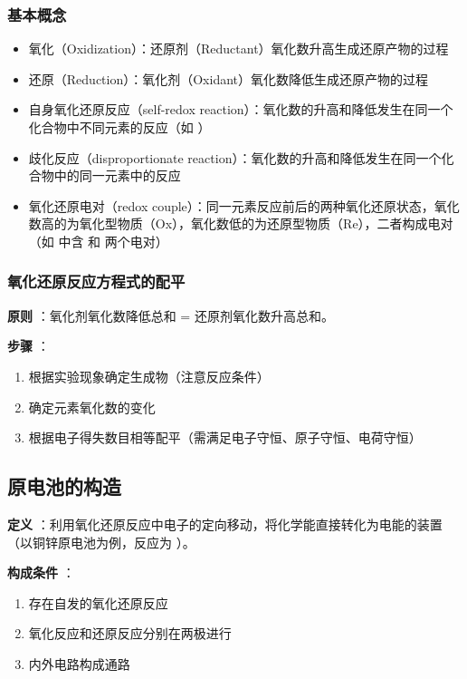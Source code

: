\subsubsection{基本概念} 
\begin{itemize} 
    \item 氧化（Oxidization）：还原剂（Reductant）氧化数升高生成还原产物的过程
    \item 还原（Reduction）：氧化剂（Oxidant）氧化数降低生成还原产物的过程
    \item 自身氧化还原反应（self-redox reaction）：氧化数的升高和降低发生在同一个化合物中不同元素的反应（如  ）
    \item 歧化反应（disproportionate reaction）：氧化数的升高和降低发生在同一个化合物中的同一元素中的反应
    \item 氧化还原电对（redox couple）：同一元素反应前后的两种氧化还原状态，氧化数高的为氧化型物质（Ox），氧化数低的为还原型物质（Re），二者构成电对（如  中含  和  两个电对）
\end{itemize} 

\subsubsection{氧化还原反应方程式的配平} 
\textbf{原则} ：氧化剂氧化数降低总和 = 还原剂氧化数升高总和。

\textbf{步骤} ：
\begin{enumerate} 
    \item 根据实验现象确定生成物（注意反应条件）
    \item 确定元素氧化数的变化
    \item 根据电子得失数目相等配平（需满足电子守恒、原子守恒、电荷守恒）
\end{enumerate} 

\subsection{原电池的构造} 
\textbf{定义} ：利用氧化还原反应中电子的定向移动，将化学能直接转化为电能的装置（以铜锌原电池为例，反应为  ）。

\textbf{构成条件} ：
\begin{enumerate} 
    \item 存在自发的氧化还原反应
    \item 氧化反应和还原反应分别在两极进行
    \item 内外电路构成通路
\end{enumerate} 

